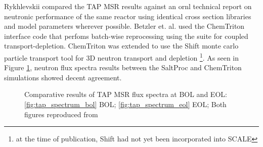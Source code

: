 
Rykhlevskii compared the TAP MSR results against an \Gls{ornl} technical report
on neutronic performance of the same reactor\cite{betzler_assessment_2017} using
identical cross section libraries and model parameters wherever possible.
Betzler et. al. used the ChemTriton\cite{betzler_molten_2017} interface code
that perfoms batch-wise reprocessing using the \SCALE suite for coupled
transport-depletion. ChemTriton was extended to use the
Shift\cite{davidson_nuclide_2018} monte carlo particle transport tool for 3D
neutron transport and depletion \footnote{at the time of publication, Shift had
not yet been incorporated into SCALE}. As seen in Figure \ref{fig:tap_spectra}, neutron flux
spectra results between the SaltProc and ChemTriton simulations showed decent
agreement.

\begin{figure}[htpb]
    \centering
    \caption[Comparative results of TAP MSR flux spectra at BOL and EOL]{
        Comparative results of TAP MSR flux spectra at BOL and EOL:
        \ref{fig:tap_spectrum_bol} BOL;
        \ref{fig:tap_spectrum_eol} EOL;
        Both figures reproduced from \cite{rykhlevskii_fuel_2020}
    }
    \label{fig:tap_spectra}
\end{figure}

